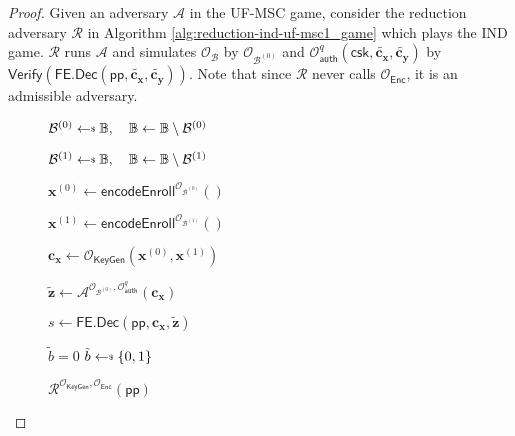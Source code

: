 \begin{proof}
\label{proof:ind-uf-msc1}
	Given an adversary $\mathcal{A}$ in the \textsf{UF-MSC} game, consider the reduction adversary $\mathcal{R}$ in Algorithm \ref{alg:reduction-ind-uf-msc1_game} which plays the \textsf{IND} game. $\mathcal{R}$ runs $\mathcal{A}$ and simulates $\mathcal{O}_{\mathcal{B}}$ by $\mathcal{O}_{\mathcal{B}^{(0)}}$ and $\mathcal{O}_{\textsf{auth}}^q (\textsf{csk}, \mathbf{\tilde{c_x}}, \mathbf{\tilde{c_y}})$ by $\textsf{Verify}( \textsf{FE.Dec}(\textsf{pp}, \mathbf{\tilde{c_x}}, \mathbf{\tilde{c_y}}) )$. Note that since $\mathcal{R}$ never calls $\mathcal{O}_{\textsf{Enc}}$, it is an admissible adversary.

\begin{figure}[h]
\centering
	
	\begin{minipage}[t]{0.5\linewidth}
	\centering
	\begin{algorithm}[H]
		\caption{$\mathcal{R}^{\mathcal{O}_{\textsf{KeyGen}}, \mathcal{O}_{\textsf{Enc}}}(\textsf{pp})$}
	\label{alg:reduction-ind-uf-msc1_game}
	\begin{algorithmic}[1]
		\State $\mathcal{B}^{(0)} \getsdollar \mathbb{B}, \quad \mathbb{B} \gets \mathbb{B} \setminus \mathcal{B}^{(0)}$

		\State $\mathcal{B}^{(1)} \getsdollar \mathbb{B}, \quad \mathbb{B} \gets \mathbb{B} \setminus \mathcal{B}^{(1)}$

		\State $\mathbf{x}^{(0)} \gets \textsf{encodeEnroll}^{\mathcal{O}_{\mathcal{B}^{(0)}}}()$

		\State $\mathbf{x}^{(1)} \gets \textsf{encodeEnroll}^{\mathcal{O}_{\mathcal{B}^{(1)}}}()$

		\State $\mathbf{c_x} \gets \mathcal{O}_{\textsf{KeyGen}}(\mathbf{x}^{(0)}, \mathbf{x}^{(1)})$

		\State ${\mathbf{\tilde{z}}} \gets \mathcal{A}^{\mathcal{O}_{\mathcal{B}^{(0)}}, \mathcal{O}_\textsf{auth}^q } ( \mathbf{c_x} )$

		\State $s \gets \textsf{FE.Dec}( \textsf{pp}, \mathbf{c_x}, \mathbf{\tilde{z}} )$

		 \label{alg:reduction-ind-uf-msc1_game:verify}
			\State \Return $\tilde{b} = 0$
		\Else
			\State \Return $\tilde{b} \getsdollar \{0, 1\}$
		\EndIf

	\end{algorithmic}
	\end{algorithm}
	\end{minipage}
	

\end{figure}
\end{proof}
